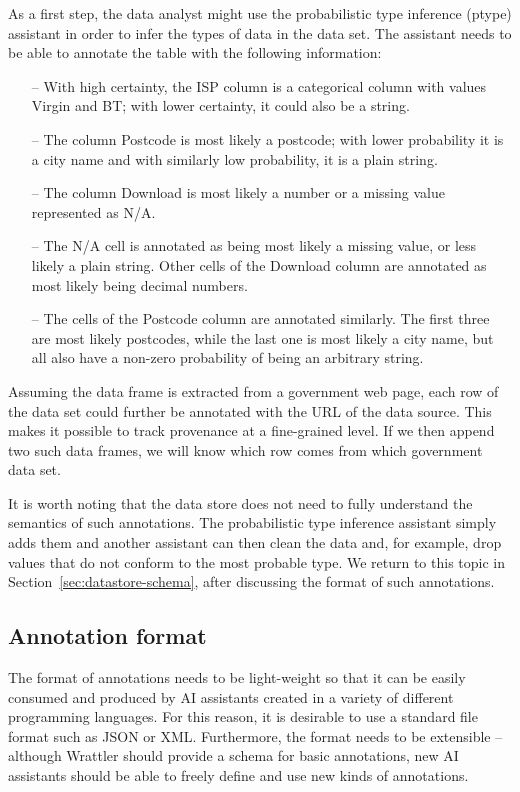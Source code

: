 \documentclass[sigplan,preprint,10pt]{acmart}\settopmatter{printfolios=true,printccs=false,printacmref=false}
\theoremstyle{plain}
\theoremstyle{definition}
\begin{document}
{\noindent
As a first step, the data analyst might use the probabilistic type inference (ptype) assistant
in order to infer the types of data in the data set. The assistant needs to be able to annotate
the table with the following information:
%
\begin{itemize}
\item[--] With high certainty, the ISP column is a categorical column with values Virgin and BT;
  with lower certainty, it could also be a string.
\item[--] The column Postcode is most likely a postcode; with lower probability it is a city name
  and with similarly low probability, it is a plain string.
\item[--] The column Download is most likely a number or a missing value represented as N/A.  
\item[--] The N/A cell is annotated as being most likely a missing value, or less likely a plain 
  string. Other cells of the Download column are annotated as most likely being decimal numbers.
\item[--] The cells of the Postcode column are annotated similarly. The first three are most
  likely postcodes, while the last one is most likely a city name, but all also have a non-zero
  probability of being an arbitrary string.
\end{itemize}

\noindent
Assuming the data frame is extracted from a government web page, each row of the data set
could further be annotated with the URL of the data source. This makes it possible to track
provenance at a fine-grained level. If we then append two such data frames, we will know
which row comes from which government data set.

It is worth noting that the data store does not need to fully understand the semantics of such 
annotations. The probabilistic type inference assistant simply adds them and another assistant
can then clean the data and, for example, drop values that do not conform to the most 
probable type. We return to this topic in Section~\ref{sec:datastore-schema}, after discussing
the format of such annotations.

\subsection{Annotation format}
The format of annotations needs to be light-weight so that it can be easily consumed and produced
by AI assistants created in a variety of different programming languages. For this reason, it is
desirable to use a standard file format such as JSON or XML. Furthermore, the format needs to 
be extensible -- although Wrattler should provide a schema for basic annotations, new AI assistants
should be able to freely define and use new kinds of annotations.

}
\end{document}
